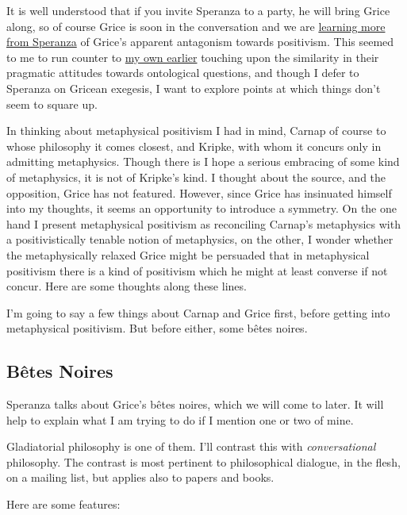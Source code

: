 \documentclass{article}
\begin{document}
It is well understood that if you invite Speranza to a party, he will bring Grice along, so of course Grice is soon in the conversation and we are \href{http://rbjones.com/pipermail/hist-analytic_rbjones.com/2009q2/000268.html}{learning more from Speranza} of Grice's apparent antagonism towards positivism.
This seemed to me to run counter to \href{http://rbjones.com/pipermail/hist-analytic_rbjones.com/2009q2/000254.html}{my own earlier} touching upon the similarity in their pragmatic attitudes towards ontological questions, and though I defer to Speranza on Gricean exegesis, I want to explore points at which things don't seem to square up.

In thinking about metaphysical positivism I had in mind, Carnap of course to whose philosophy it comes closest, and Kripke, with whom it concurs only in admitting metaphysics.
Though there is I hope a serious embracing of some kind of metaphysics, it is not of Kripke's kind.
I thought about the source, and the opposition, Grice has not featured.
However, since Grice has insinuated himself into my thoughts, it seems an opportunity to introduce a symmetry.
On the one hand I present metaphysical positivism as reconciling Carnap's metaphysics with a positivistically tenable notion of metaphysics, on the other, I wonder whether the metaphysically relaxed Grice might be persuaded that in metaphysical positivism there is a kind of positivism which he might at least converse if not concur. 
Here are some thoughts along these lines.

I'm going to say a few things about Carnap and Grice first, before getting into metaphysical positivism. 
But before either, some b\^{e}tes noires.

\subsection{B\^{e}tes Noires}

Speranza talks about Grice's b\^{e}tes noires, which we will come to later.
It will help to explain what I am trying to do if I mention one or two of mine.

Gladiatorial philosophy is one of them.
I'll contrast this with {\it conversational} philosophy.
The contrast is most pertinent to philosophical dialogue, in the flesh, on a mailing list, but applies also to papers and books.

Here are some features:
\end{document}
